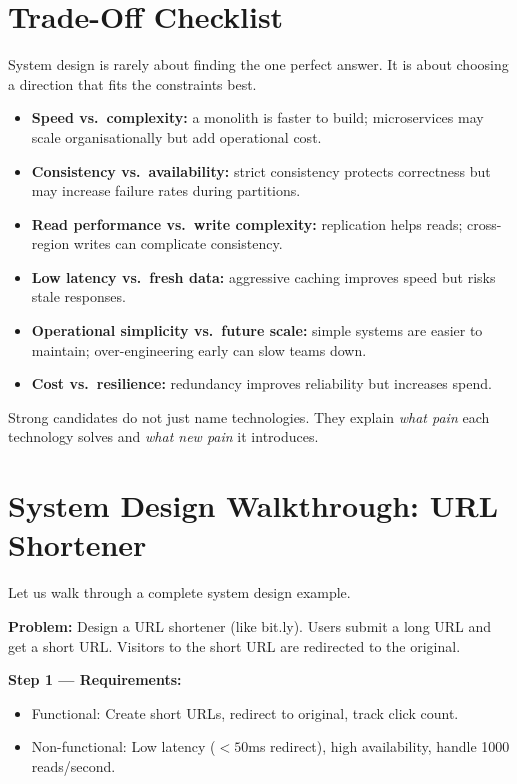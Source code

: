 \documentclass[12pt, a4paper, oneside]{book}
\begin{document}
\section{Trade-Off Checklist}

System design is rarely about finding the one perfect answer. It is about choosing a direction that fits the constraints best.

\begin{itemize}[leftmargin=2em]
    \item \textbf{Speed vs.\ complexity:} a monolith is faster to build; microservices may scale organisationally but add operational cost.
    \item \textbf{Consistency vs.\ availability:} strict consistency protects correctness but may increase failure rates during partitions.
    \item \textbf{Read performance vs.\ write complexity:} replication helps reads; cross-region writes can complicate consistency.
    \item \textbf{Low latency vs.\ fresh data:} aggressive caching improves speed but risks stale responses.
    \item \textbf{Operational simplicity vs.\ future scale:} simple systems are easier to maintain; over-engineering early can slow teams down.
    \item \textbf{Cost vs.\ resilience:} redundancy improves reliability but increases spend.
\end{itemize}

\begin{intuitionbox}
Strong candidates do not just name technologies. They explain \emph{what pain} each technology solves and \emph{what new pain} it introduces.
\end{intuitionbox}

\section{System Design Walkthrough: URL Shortener}

Let us walk through a complete system design example.

\textbf{Problem:} Design a URL shortener (like bit.ly). Users submit a long URL and get a short URL. Visitors to the short URL are redirected to the original.

\textbf{Step 1 --- Requirements:}
\begin{itemize}[leftmargin=2em]
    \item Functional: Create short URLs, redirect to original, track click count.
    \item Non-functional: Low latency ($< 50$ms redirect), high availability, handle 1000 reads/second.
\end{itemize}
\end{document}
